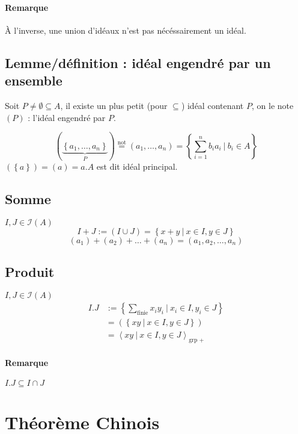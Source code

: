 \documentclass[reqno,a4paper,10pt]{report}
\newcommand{\gen}[1]{\left\langle #1 \right\rangle} %
\newcommand{\set}[1]{\left\lbrace #1 \right\rbrace} %
\newcommand{\underb}[2]{\underset{#1}{\underbrace{#2}}}
\newcommand{\Such}{\ \Big| \ }
\newcommand{\such}{\ | \ }
\newcommand{\tnot}[1]{\overset{\text{not}}{ #1 }}
\begin{document}
\paragraph{Remarque}
À l'inverse, une union d'idéaux n'est pas nécéssairement un idéal.

\subsection{Lemme/définition : idéal engendré par un ensemble}
Soit $P\neq \emptyset \subseteq A$, il existe un plus petit (pour $\subseteq$)
idéal contenant $P$, on le note $(P)$ : l'idéal engendré par $P$.
\begin{comment}
  Preuve 22/10/09 p2
\end{comment}

\[(\underb{P}{\set{a_1, \dots, a_n}})\tnot{=}(a_1, \dots, a_n) =
\set{\sum_{i=1}^n b_i a_i \Such b_i \in A}\]
$(\set{a}) = (a) = a. A$ est dit idéal principal.

\subsection{Somme}
$I, J \in \mathcal I (A)$
\[I+J:=(I\cup J)=\set{x+y \Such x \in I, y \in J}\]
\[(a_1)+(a_2)+\dots+(a_n) = (a_1, a_2, \dots, a_n)\]

\subsection{Produit}
$I,J \in \mathcal{I}(A)$
\begin{align*}
  I.J&:=\set{\sum_{\text{finie}}x_i y_i \Such x_i \in I, y_i \in J}\\
  &=\left( \set{xy \such x\in I, y\in J} \right)\\
  &=\gen{xy \such x\in I, y\in J}_{\text{grp }+}
\end{align*}

\paragraph{Remarque} $I.J \subseteq I\cap J$

\section{Théorème Chinois}
\end{document}
